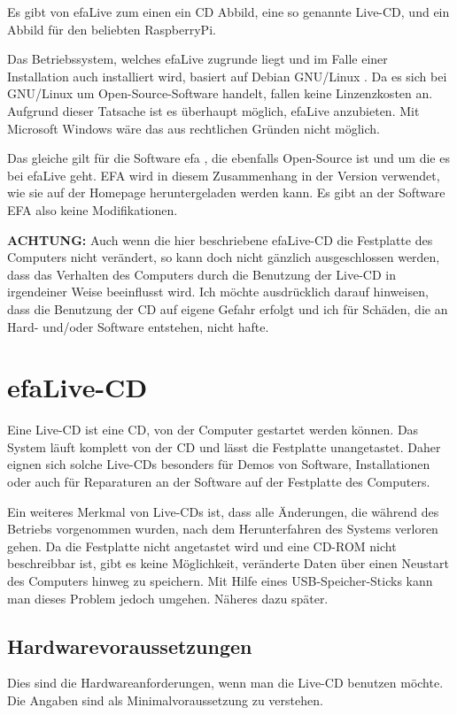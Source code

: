 \documentclass[a4paper,12pt,twoside]{article}
\begin{document}
Es gibt von efaLive zum einen ein CD Abbild, eine so genannte Live-CD, und ein 
Abbild für den beliebten RaspberryPi.

Das Betriebssystem, welches efaLive zugrunde liegt und im Falle einer
Installation auch installiert wird, basiert auf Debian GNU/Linux \cite{DEB1}.
Da es sich bei GNU/Linux um Open-Source-Software handelt, fallen keine
Linzenzkosten an. Aufgrund dieser Tatsache ist es überhaupt möglich,
efaLive anzubieten. Mit Microsoft Windows wäre das aus
rechtlichen Gründen nicht möglich.

Das gleiche gilt für die Software efa \cite{EFA1}, die ebenfalls
Open-Source ist und um die es bei efaLive geht. EFA wird in diesem Zusammenhang
in der Version verwendet, wie sie auf der Homepage heruntergeladen werden kann. 
Es gibt an der Software EFA also keine Modifikationen.

\bigskip
\textbf{ACHTUNG:} Auch wenn die hier beschriebene efaLive-CD die Festplatte des
Computers nicht verändert, so kann doch nicht gänzlich ausgeschlossen
werden, dass das Verhalten des Computers durch die Benutzung der
Live-CD in irgendeiner Weise beeinflusst wird. Ich möchte ausdrücklich
darauf hinweisen, dass die Benutzung der CD auf eigene Gefahr erfolgt
und ich für Schäden, die an Hard- und/oder Software entstehen, nicht
hafte.
\bigskip

\section{efaLive-CD}
\label{sct:efalivecd}
Eine Live-CD ist eine CD, von der Computer
gestartet werden können. Das System läuft komplett von der CD und lässt
die Festplatte unangetastet. Daher eignen sich solche Live-CDs
besonders für Demos von Software, Installationen oder auch für
Reparaturen an der Software auf der Festplatte des Computers.

Ein weiteres Merkmal von Live-CDs ist, dass alle Änderungen, die während
des Betriebs vorgenommen wurden, nach dem Herunterfahren des Systems
verloren gehen. Da die Festplatte nicht angetastet wird und eine CD-ROM
nicht beschreibbar ist, gibt es keine Möglichkeit, veränderte Daten
über einen Neustart des Computers hinweg zu speichern. Mit Hilfe eines
USB-Speicher-Sticks kann man dieses Problem jedoch umgehen. Näheres
dazu später.

\subsection{Hardwarevoraussetzungen}
\label{sct:live_hardware}
Dies sind die Hardwareanforderungen, wenn man die Live-CD benutzen
möchte. Die Angaben sind als Minimalvoraussetzung zu verstehen.
\end{document}
